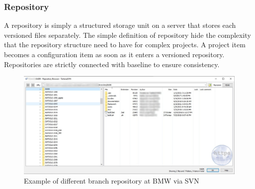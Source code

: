 \documentclass[../main.tex]{subfiles}
\begin{document}
\subsubsection{Repository}
A repository is simply a structured storage unit on a server that stores each versioned files separately. The simple definition of repository hide the complexity that the repository structure need to have for complex projects. A project item becomes a configuration item as soon as it enters a versioned repository. Repositories are strictly connected with baseline to ensure consistency. 
\begin{figure}[H]
    \centering
    \includegraphics[width=\linewidth]{images_folder/repobroswer.png.jpg}
    \caption{Example of different branch repository at \gls{BMW} via SVN}
    \label{fig:BMWREPO}
\end{figure}
\end{document}
